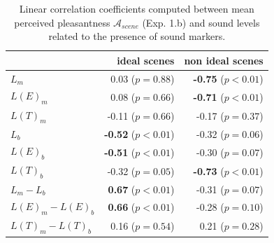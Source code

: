 \documentclass[12pt]{elsarticle}
\begin{document}
\begin{table}[t]
\setlength{\tabcolsep}{3pt}
\centering
{\renewcommand{\arraystretch}{1}
\centering
\begin{tabular}{l r r}
                  &   ideal scenes                  & non ideal scenes \\
\hline
$L_m$              & 0.03  ($p=0.88$)           & \textbf{-0.75} ($p<0.01$) \\
$L(E)_m$           & 0.08  ($p=0.66$)           & \textbf{-0.71} ($p<0.01$) \\
$L(T)_m$           & -0.11 ($p=0.66$)           & -0.17 ($p=0.37$) \\
$L_b$              & \textbf{-0.52} ($p<0.01$)  & -0.32 ($p=0.06$) \\
$L(E)_b$           & \textbf{-0.51} ($p<0.01$)  & -0.30 ($p=0.07$) \\
$L(T)_b$           & -0.32 ($p=0.05$)           & \textbf{-0.73} ($p<0.01$) \\
$L_m-L_b$          & \textbf{0.67} ($p<0.01$)   & -0.31 ($p=0.07$) \\
$L(E)_m-L(E)_b$    & \textbf{0.66} ($p<0.01$)   & -0.28 ($p=0.10$) \\
$L(T)_m-L(T)_b$    & 0.16 ($p=0.54$)            & 0.21 ($p=0.28$) \\
\hline
\end{tabular}
}
\vspace{0.5mm}
\caption{Linear correlation coefficients computed between mean perceived pleasantness $\mathcal{A}_{scene}$ (Exp. 1.b) and sound levels related to the presence of sound markers.}
\label{tab:corrMarkers}
\end{table}
\end{document}
